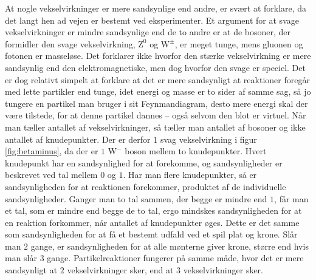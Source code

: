 At nogle vekselvirkninger er mere sandsynlige end andre, er svært at forklare, da det langt hen ad vejen er bestemt ved eksperimenter. Et argument for at svage vekselvirkninger er mindre sandsynlige end de to andre er at de bosoner, der formidler den svage vekselvirkning, $\mathrm{Z}^0$ og $\mathrm{W}^\pm$, er meget tunge, mens gluonen og fotonen er masseløse. Det forklarer ikke hvorfor den stærke vekselvirkning er mere sandsynlig end den elektromagnetiske, men dog hvorfor den svage er speciel. Det er dog relativt simpelt at forklare at det er mere sandsynligt at reaktioner foregår med lette partikler end tunge, idet energi og masse er to sider af samme sag, så jo tungere en partikel man bruger i sit Feynmandiagram, desto mere energi skal der være tilstede, for at denne partikel dannes -- også selvom den blot er virtuel. Når man tæller antallet af vekselvirkninger, så tæller man antallet af bosoner og ikke antallet af knudepunkter. Der er derfor $1$ svag vekselvirkning i figur \ref{fig:betaminus}, da der er $1$ $\mathrm{W}^-$ boson mellem to knudepunkter. Hvert knudepunkt har en sandsynlighed for at forekomme, og sandsynligheder er beskrevet ved tal mellem $0$ og $1$. Har man flere knudepunkter, så er sandsynligheden for at reaktionen forekommer, produktet af de individuelle sandsynligheder. Ganger man to tal sammen, der begge er mindre end $1$, får man et tal, som er mindre end begge de to tal, ergo mindskes sandsynligheden for at en reaktion forkommer, når antallet af knudepunkter øges. Dette er det samme som sandsynligheden for at få et bestemt udfald ved et spil plat og krone. Slår man $2$ gange, er sandsynligheden for at alle mønterne giver krone, større end hvis man slår $3$ gange. Partikelreaktioner fungerer på samme måde, hvor det er mere sandsynligt at $2$ vekselvirkninger sker, end at $3$ vekselvirkninger sker.

\nocite{cramerandersenUniversetsByggestenModerne2013}